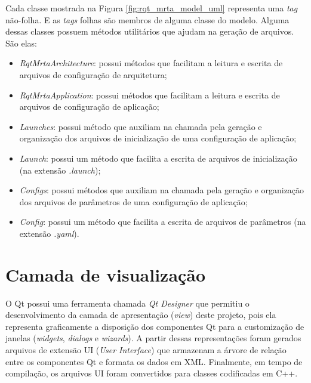         Cada classe mostrada na Figura \ref{fig:rqt_mrta_model_uml} representa uma \textit{tag} não-folha. E as \textit{tags} folhas são membros de alguma classe do modelo. Alguma dessas classes possuem métodos utilitários que ajudam na geração de arquivos. São elas:
        
        \begin{itemize}
            \item \textit{RqtMrtaArchitecture}: possui métodos que facilitam a leitura e escrita de arquivos de configuração de arquitetura;
            
            \item \textit{RqtMrtaApplication}: possui métodos que facilitam a leitura e escrita de arquivos de configuração de aplicação;
            
            \item \textit{Launches}: possui método que auxiliam na chamada pela geração e organização dos arquivos de inicialização de uma configuração de aplicação;
            
            \item \textit{Launch}: possui um método que facilita a escrita de arquivos de inicialização (na extensão \textit{.launch});
            
            \item \textit{Configs}: possui métodos que auxiliam na chamada pela geração e organização dos arquivos de parâmetros de uma configuração de aplicação;
            
            \item \textit{Config}: possui um método que facilita a escrita de arquivos de parâmetros (na extensão \textit{.yaml}).
        \end{itemize}
        
    \section{Camada de visualização} \label{subsec:rqt_mrta_view}
        O Qt \cite{ref:yafei2012qt} possui uma ferramenta chamada \textit{Qt Designer} que permitiu o desenvolvimento da camada de apresentação (\textit{view}) deste projeto, pois ela representa graficamente a disposição dos componentes Qt para a customização de janelas (\textit{widgets}, \textit{dialogs} e \textit{wizards}). A partir dessas representações foram gerados arquivos de extensão UI (\textit{User Interface}) que armazenam a árvore de relação entre os componentes Qt e formata os dados em XML. Finalmente, em tempo de compilação, os arquivos UI foram convertidos para classes codificadas em C++.
        
